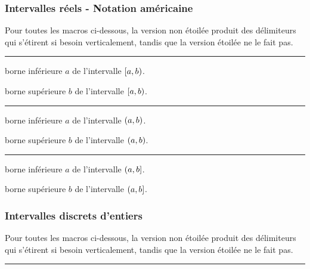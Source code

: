 \documentclass[12pt,a4paper]{article}
\theoremstyle{definition}
\newcommand\separation{
	\medskip
	\hfill\rule{0.5\textwidth}{0.75pt}\hfill
	\medskip
}
\begin{document}
\subsubsection{Intervalles réels - Notation américaine}

Pour toutes les macros ci-dessous, la version non étoilée produit des délimiteurs qui s'étirent si besoin verticalement, tandis que la version étoilée ne le fait pas.


\separation





 borne inférieure $a$ de l'intervalle $\intervalCP{a}{b}$.

 borne supérieure $b$ de l'intervalle $\intervalCP{a}{b}$.


\separation




 borne inférieure $a$ de l'intervalle $\intervalP{a}{b}$.

 borne supérieure $b$ de l'intervalle $\intervalP{a}{b}$.


\separation




 borne inférieure $a$ de l'intervalle $\intervalPC{a}{b}$.

 borne supérieure $b$ de l'intervalle $\intervalPC{a}{b}$.






\subsubsection{Intervalles discrets d'entiers}

Pour toutes les macros ci-dessous, la version non étoilée produit des délimiteurs qui s'étirent si besoin verticalement, tandis que la version étoilée ne le fait pas.


\separation



\end{document}
